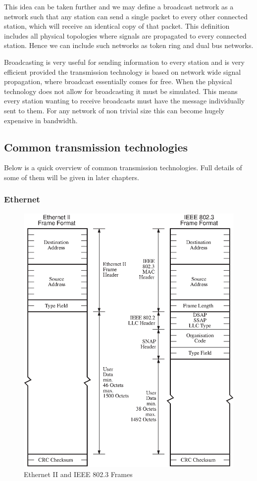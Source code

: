 This idea can be taken further and we may define a broadcast network
as a network such that any station can send a single packet to every
other connected station, which will receive an identical copy of that
packet.  This definition includes all physical topologies where
signals are propagated to every connected station.  Hence we can
include such networks as token ring and dual bus networks.

Broadcasting is very useful for sending information to every station
and is very efficient provided the transmission technology is based on
network wide signal propagation, where broadcast essentially comes for
free.  When the physical technology does not allow for broadcasting it
must be simulated.  This means every station wanting to receive
broadcasts must have the message individually sent to them.  For any
network of non trivial size this can become hugely expensive in
bandwidth.

\subsection{Common transmission technologies}

Below is a quick overview of common transmission technologies.  Full
details of some of them will be given in later chapters.

\subsubsection{Ethernet}

\begin{figure}
\includegraphics{pics/enet.eps}
\caption{Ethernet II and IEEE 802.3 Frames}
\label{network:enet}
\end{figure}

